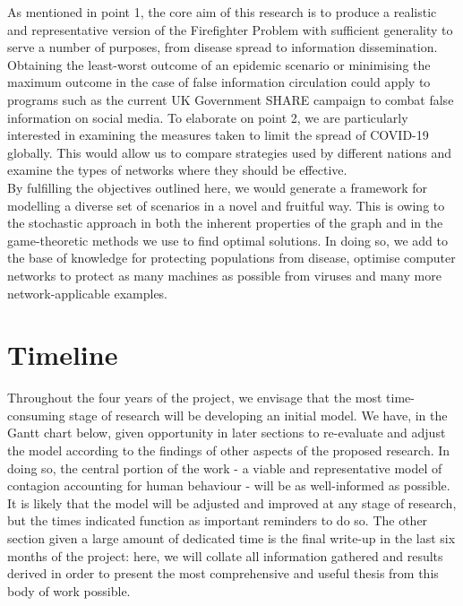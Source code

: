 \documentclass[hidelinks,a4paper,11pt]{article}
\numberwithin{equation}{section}
\begin{document}
As mentioned in point 1, the core aim of this research is to produce a realistic and representative version of the Firefighter Problem with sufficient generality to serve a number of purposes, from disease spread to information dissemination. Obtaining the least-worst outcome of an epidemic scenario or minimising the maximum outcome in the case of false information circulation could apply to programs such as the current UK Government SHARE campaign to combat false information on social media. \cite{govt20} To elaborate on point 2, we are particularly interested in examining the measures taken to limit the spread of COVID-19 globally. This would allow us to compare strategies used by different nations and examine the types of networks where they should be effective.\\ %

By fulfilling the objectives outlined here, we would generate a framework for modelling a diverse set of scenarios in a novel and fruitful way. This is owing to the stochastic approach in both the inherent properties of the graph and in the game-theoretic methods we use to find optimal solutions. In doing so, we add to the base of knowledge for protecting populations from disease, optimise computer networks to protect as many machines as possible from viruses and many more network-applicable examples.\\

\section{Timeline}
\label{sec:timeline}
Throughout the four years of the project, we envisage that the most time-consuming stage of research will be developing an initial model. We have, in the Gantt chart below, given opportunity in later sections to re-evaluate and adjust the model according to the findings of other aspects of the proposed research. In doing so, the central portion of the work - a viable and representative model of contagion accounting for human behaviour - will be as well-informed as possible. It is likely that the model will be adjusted and improved at any stage of research, but the times indicated function as important reminders to do so. The other section given a large amount of dedicated time is the final write-up in the last six months of the project: here, we will collate all information gathered and results derived in order to present the most comprehensive and useful thesis from this body of work possible.
\end{document}
